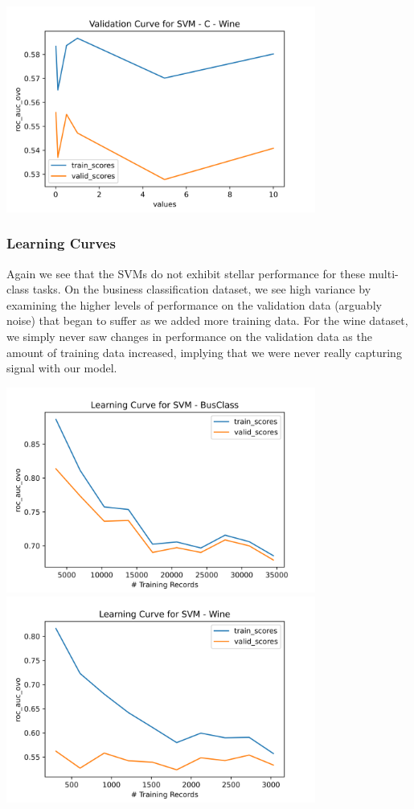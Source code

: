 \documentclass[
	letterpaper, %
]{jdf}
\begin{document}
\includegraphics[width=4in]{Figures/Wine-0921/SVM/val_curve_1.png}

\subsubsection{Learning Curves}

Again we see that the SVMs do not exhibit stellar performance for these multi-class tasks. On the business classification dataset, we see high variance by examining the higher levels of performance on the validation data (arguably noise) that began to suffer as we added more training data. For the wine dataset, we simply never saw changes in performance on the validation data as the amount of training data increased, implying that we were never really capturing signal with our model.

\includegraphics[width=4in]{Figures/BusClass-0920/SVM/learn_curve.png}
\includegraphics[width=4in]{Figures/Wine-0921/SVM/learn_curve.png}
\end{document}
